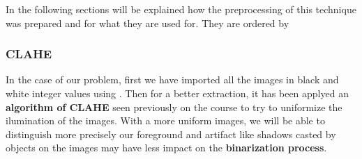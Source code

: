\documentclass[10pt]{article}
\begin{document}
In the following sections will be explained how the preprocessing of this technique was prepared and for what they are used for. They are ordered by    

\subsubsection*{CLAHE}

In the case of our problem, first we have imported all the images in black and white integer values using . Then for a better extraction, it has been applyed an \textbf{algorithm of CLAHE} seen previously on the course to try to uniformize the ilumination of the images. With a more uniform images, we will be able to distinguish more precisely our foreground and artifact like shadows casted by objects on the images may have less impact on the \textbf{binarization process}.
\end{document}
